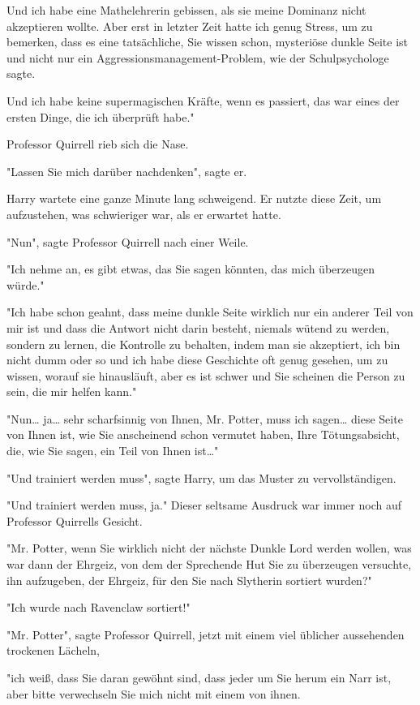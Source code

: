 {Und ich habe eine Mathelehrerin gebissen, als sie meine Dominanz nicht akzeptieren wollte. Aber erst in letzter Zeit hatte ich genug Stress, um zu bemerken, dass es eine tatsächliche, Sie wissen schon, mysteriöse dunkle Seite ist und nicht nur ein Aggressionsmanagement-Problem, wie der Schulpsychologe sagte.

Und ich habe keine supermagischen Kräfte, wenn es passiert, das war eines der ersten Dinge, die ich überprüft habe."

Professor Quirrell rieb sich die Nase.

"Lassen Sie mich darüber nachdenken", sagte er.

Harry wartete eine ganze Minute lang schweigend. Er nutzte diese Zeit, um aufzustehen, was schwieriger war, als er erwartet hatte.

"Nun", sagte Professor Quirrell nach einer Weile.

"Ich nehme an, es gibt etwas, das Sie sagen könnten, das mich überzeugen würde."

"Ich habe schon geahnt, dass meine dunkle Seite wirklich nur ein anderer Teil von mir ist und dass die Antwort nicht darin besteht, niemals wütend zu werden, sondern zu lernen, die Kontrolle zu behalten, indem man sie akzeptiert, ich bin nicht dumm oder so und ich habe diese Geschichte oft genug gesehen, um zu wissen, worauf sie hinausläuft, aber es ist schwer und Sie scheinen die Person zu sein, die mir helfen kann."

"Nun… ja… sehr scharfsinnig von Ihnen, Mr. Potter, muss ich sagen… diese Seite von Ihnen ist, wie Sie anscheinend schon vermutet haben, Ihre Tötungsabsicht, die, wie Sie sagen, ein Teil von Ihnen ist…"

"Und trainiert werden muss", sagte Harry, um das Muster zu vervollständigen.

"Und trainiert werden muss, ja." Dieser seltsame Ausdruck war immer noch auf Professor Quirrells Gesicht.

"Mr. Potter, wenn Sie wirklich nicht der nächste Dunkle Lord werden wollen, was war dann der Ehrgeiz, von dem der Sprechende Hut Sie zu überzeugen versuchte, ihn aufzugeben, der Ehrgeiz, für den Sie nach Slytherin sortiert wurden?"

"Ich wurde nach Ravenclaw sortiert!"

"Mr. Potter", sagte Professor Quirrell, jetzt mit einem viel üblicher aussehenden trockenen Lächeln,

"ich weiß, dass Sie daran gewöhnt sind, dass jeder um Sie herum ein Narr ist, aber bitte verwechseln Sie mich nicht mit einem von ihnen.

}
